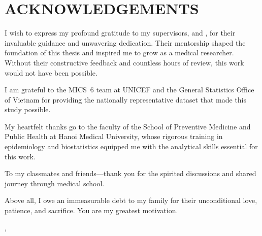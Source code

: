 \chapter*{ACKNOWLEDGEMENTS}
{}

I wish to express my profound gratitude to my supervisors, \textbf{\SupervisorNameA} and \textbf{\SupervisorNameB}, for their invaluable guidance and unwavering dedication. Their mentorship shaped the foundation of this thesis and inspired me to grow as a medical researcher. Without their constructive feedback and countless hours of review, this work would not have been possible.

I am grateful to the MICS~6 team at UNICEF and the General Statistics Office of Vietnam for providing the nationally representative dataset that made this study possible.

My heartfelt thanks go to the faculty of the School of Preventive Medicine and Public Health at Hanoi Medical University, whose rigorous training in epidemiology and biostatistics equipped me with the analytical skills essential for this work.

To my classmates and friends---thank you for the spirited discussions and shared journey through medical school.

Above all, I owe an immeasurable debt to my family for their unconditional love, patience, and sacrifice. You are my greatest motivation.

\begin{flushright}
\SubmissionCity, \SubmissionYear\\[0.3cm]
\textbf{\StudentName}
\end{flushright}

\clearpage

